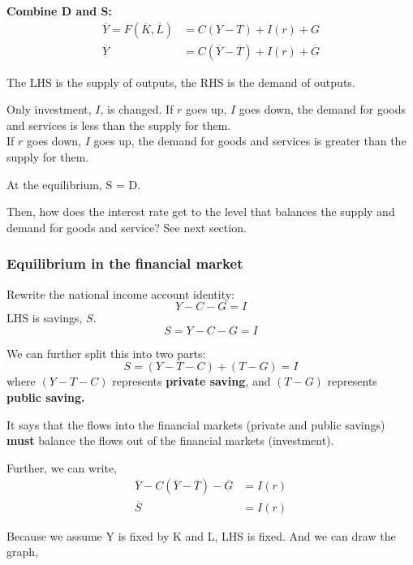 \documentclass[12pt]{article}
\begin{document}
{\textbf {Combine D and S:}}
\begin{align*}
\overline{Y} = F( \overline{K},  \overline{L}) &= C(Y - T) + I(r) + G\\
\overline{Y} &= C( \overline{Y} -  \overline{T}) + I(r) +  \overline{G}
\end{align*}

The LHS is the supply of outputs, the RHS is the demand of outputs.

Only investment, $ I $, is changed. 
If $ r $ goes up, $ I $ goes down, the demand for goods and services is less than the
supply for them.\\
If $ r $ goes down, $ I $ goes up, the demand for goods and services is greater than the
supply for them.

At the equilibrium, S = D.

Then, how does the interest rate get to the level that balances the supply and demand
for goods and service? See next section.


\subsubsection{Equilibrium in the financial market}
Rewrite the national income account identity:
\begin{equation*}
Y - C - G = I
\end{equation*}
LHS is savings, $ S $.
\begin{equation*}
S = Y - C - G = I
\end{equation*}

We can further split this into two parts:
\begin{equation*}
S = (Y - T - C) + (T - G) = I
\end{equation*}
where $ (Y - T - C) $ represents {\textbf {private saving}}, and $ (T - G) $ represents
{\textbf {public saving.}}

It says that the flows into the financial markets (private and public savings) 
{\textbf {must}} balance the flows out of the financial markets (investment).

Further, we can write,
\begin{align*}
\overline{Y} - C( \overline{Y} -  \overline{T}) -  \overline{G} &= I(r)\\
 \overline{S} &= I(r)
\end{align*}

Because we assume Y is fixed by K and L, LHS is fixed. And we can draw the graph,
\end{document}
